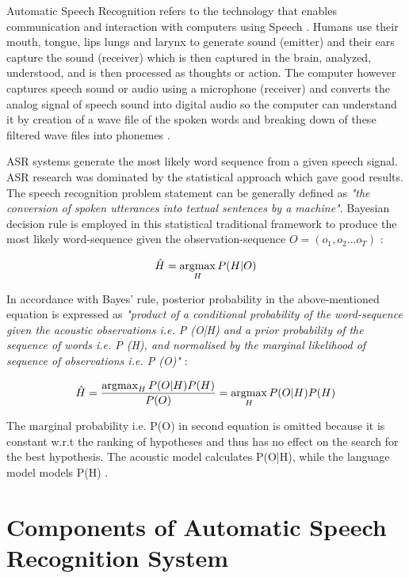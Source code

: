 Automatic Speech Recognition refers to the technology that enables communication and interaction with computers using Speech \cite{lakshmi_sri_kaldi_2020}. Humans use their mouth, tongue, lips lungs and larynx to generate sound (emitter) and their ears capture the sound (receiver) which is then captured in the brain, analyzed, understood, and is then processed as thoughts or action. The computer however captures speech sound or audio using a microphone (receiver) and converts the analog signal of speech sound into digital audio so the computer can understand it by creation of a wave file of the spoken words and breaking down of these filtered wave files into phonemes \cite{backstrom_introduction_2022}. 

ASR systems generate the most likely word sequence from a given speech signal. ASR research was dominated by the statistical approach which gave good results. The speech recognition problem statement can be generally defined as \textit{"the conversion of spoken utterances into textual sentences by a machine"}. Bayesian decision rule is employed in this statistical traditional framework to produce the most likely word-sequence given the observation-sequence $O=(o_{1},o_{2}...o_{T})$ \cite{maglogiannis__2020}:

\begin{equation}
\centering
\hat{H} = \argmax_{H} P(H|O)    
\end{equation}

In accordance with Bayes' rule, posterior probability in the above-mentioned equation is expressed as \textit{"product of a conditional probability of the word-sequence given the acoustic observations i.e. P (O|H) and a prior probability of the sequence of words i.e. P (H), and normalised by the marginal likelihood of sequence of observations i.e. P (O)"} \cite{backstrom_introduction_2022}:

\begin{equation}
\centering
\hat{H} = \frac{\argmax_{H} P(O|H) P(H)} {P(O)}
= \argmax_{H} P(O|H) P(H) 
\end{equation}

The marginal probability i.e. P(O) in second equation is omitted because it is constant w.r.t the ranking of hypotheses and thus has no effect on the search for the best hypothesis. The acoustic model calculates P(O|H), while the language model models P(H) \cite{backstrom_introduction_2022}.

\section{Components of Automatic Speech Recognition System}
\label{sec:components-of-asr}

